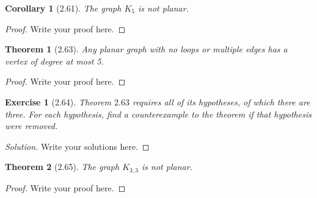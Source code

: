 \documentclass{article}
\newtheorem*{thm}{Theorem}
\newtheorem*{ex}{Exercise}
\newtheorem*{cor}{Corollary}
\newenvironment{solution}
  {\begin{proof}[Solution]}
  {\renewcommand{\qedsymbol}{}\end{proof}}
\begin{document}
\begin{cor}[2.61]
	The graph $K_5$ is not planar.
\end{cor}
\begin{proof}
    Write your proof here.
\end{proof}

\begin{thm}[2.63]
	Any planar graph with no loops or multiple edges has a vertex of degree at most 5.
\end{thm}
\begin{proof}
    Write your proof here.
\end{proof}

\begin{ex}[2.64]
	Theorem $2.63$ requires all of its hypotheses, of which there are three. For each hypothesis, find a counterexample to the theorem if that hypothesis were removed.
\end{ex}
\begin{solution}
    Write your solutions here.
\end{solution}

\begin{thm}[2.65]
	The graph $K_{3,3}$ is not planar.
\end{thm}
\begin{proof}
    Write your proof here.
\end{proof}
\end{document}
